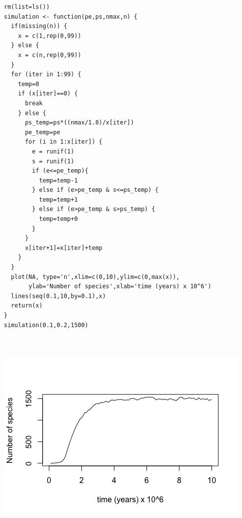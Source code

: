 \documentclass{article}
\begin{document}
\begin{verbatim}
rm(list=ls())
simulation <- function(pe,ps,nmax,n) {
  if(missing(n)) {
    x = c(1,rep(0,99))
  } else {
    x = c(n,rep(0,99))
  }
  for (iter in 1:99) {
    temp=0
    if (x[iter]==0) {
      break 
    } else {
      ps_temp=ps*((nmax/1.8)/x[iter])
      pe_temp=pe
      for (i in 1:x[iter]) {
        e = runif(1)
        s = runif(1)
        if (e<=pe_temp){
          temp=temp-1
        } else if (e>pe_temp & s<=ps_temp) {
          temp=temp+1
        } else if (e>pe_temp & s>ps_temp) {
          temp=temp+0
        }
      }
      x[iter+1]=x[iter]+temp
    }
  }
  plot(NA, type='n',xlim=c(0,10),ylim=c(0,max(x)),
       ylab='Number of species',xlab='time (years) x 10^6')
  lines(seq(0.1,10,by=0.1),x) 
  return(x)
}
simulation(0.1,0.2,1500)



\end{verbatim}
\includegraphics[width=\textwidth]{images/4c.png}
\end{document}
